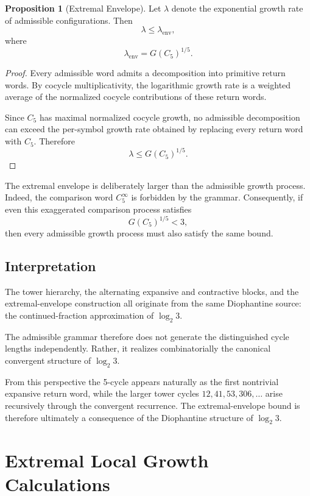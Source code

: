 \documentclass[12pt, oneside]{article}
\numberwithin{equation}{section}
\theoremstyle{definition}
\newtheorem{proposition}{Proposition}[section]
\theoremstyle{plain}
\theoremstyle{remark}
\begin{document}
\begin{proposition}[Extremal Envelope]
\label{prop:extremal-envelope}
Let $\lambda$ denote the exponential growth rate of admissible
configurations. Then
\[
\lambda
\le
\lambda_{\mathrm{env}},
\]
where
\[
\lambda_{\mathrm{env}}
=
G(C_5)^{1/5}.
\]
\end{proposition}

\begin{proof}
Every admissible word admits a decomposition into primitive return words.
By cocycle multiplicativity, the logarithmic growth rate is a weighted
average of the normalized cocycle contributions of these return words.

Since $C_5$ has maximal normalized cocycle growth, no admissible
decomposition can exceed the per-symbol growth rate obtained by replacing
every return word with $C_5$. Therefore
\[
\lambda
\le
G(C_5)^{1/5}.
\]
\end{proof}

The extremal envelope is deliberately larger than the admissible growth
process. Indeed, the comparison word $C_5^\infty$ is forbidden by the
grammar. Consequently, if even this exaggerated comparison process
satisfies
\[
G(C_5)^{1/5}<3,
\]
then every admissible growth process must also satisfy the same bound.

\subsection{Interpretation}

The tower hierarchy, the alternating expansive and contractive blocks,
and the extremal-envelope construction all originate from the same
Diophantine source: the continued-fraction approximation of
\(\log_2 3\).

The admissible grammar therefore does not generate the distinguished
cycle lengths independently. Rather, it realizes combinatorially the
canonical convergent structure of \(\log_2 3\).

From this perspective the 5-cycle appears naturally as the first
nontrivial expansive return word, while the larger tower cycles
\(12,41,53,306,\ldots\) arise recursively through the convergent
recurrence. The extremal-envelope bound is therefore ultimately a
consequence of the Diophantine structure of \(\log_2 3\).

\newpage
\section{Extremal Local Growth Calculations}
\label{app:local-growth-details}
\end{document}
